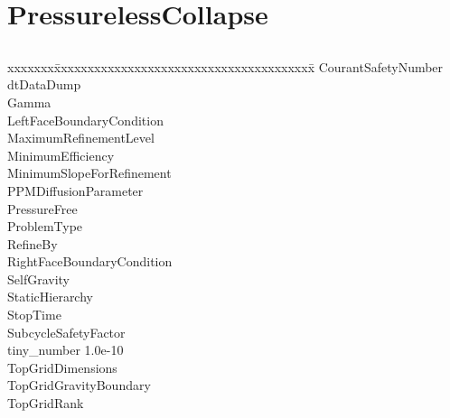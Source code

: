 \documentclass{book}
\begin{document}
\subsection{\cello}

\section{PressurelessCollapse} \label{s:PressurelessCollapse}

\subsection{\enzo}

{\parametersize
\begin{tabbing}
xxxxxxx\=xxxxxxxxxxxxxxxxxxxxxxxxxxxxxxxxxxxxxxx\=\kill
\> CourantSafetyNumber         \\
\> dtDataDump              \\
\> Gamma                   \\
\> LeftFaceBoundaryCondition       \\
\> MaximumRefinementLevel         \\
\> MinimumEfficiency            \\
\> MinimumSlopeForRefinement    \\
\> PPMDiffusionParameter          \\
\> PressureFree                   \\
\> ProblemType                   \\
\> RefineBy                       \\
\> RightFaceBoundaryCondition      \\
\> SelfGravity                    \\
\> StaticHierarchy                \\
\> StopTime                \\
\> SubcycleSafetyFactor           \\
\> tiny\_number            \> 1.0e-10  \\
\> TopGridDimensions       \\
\> TopGridGravityBoundary         \\
\> TopGridRank            
\end{tabbing}}
\end{document}
